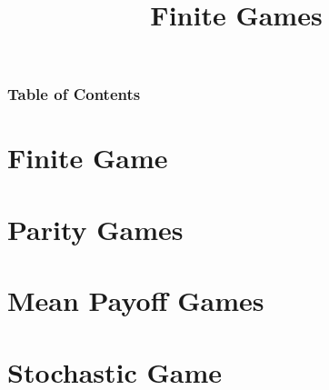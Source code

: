 \documentclass{beamer}
\title{Finite Games}
\begin{document}
  \frame{\titlepage}

  \begin{frame}
    \frametitle{Table of Contents}
    \tableofcontents
  \end{frame}

  \section{Finite Game}
    
  \section{Parity Games}
    
  \section{Mean Payoff Games}
    
  \section{Stochastic Game}
\end{document}
